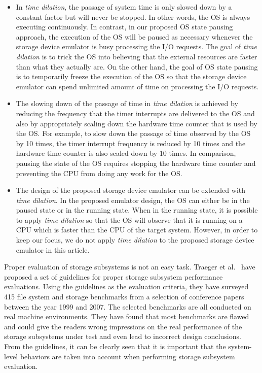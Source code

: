 \begin{itemize}
	\item  In \textit{time dilation}, the passage of system time is only slowed down by a constant factor but will never be stopped. In other words, the OS is always executing continuously. In contrast, in our proposed OS state pausing approach, the execution of the OS will be paused as necessary whenever the storage device emulator is busy processing the I/O requests. The goal of \textit{time dilation} is to trick the OS into believing that the external resources are faster than what they actually are. On the other hand, the goal of OS state pausing is to temporarily freeze the execution of the OS so that the storage device emulator can spend unlimited amount of time on processing the I/O requests.
	
	\item The slowing down of the passage of time in \textit{time dilation} is achieved by reducing the frequency that the timer interrupts are delivered to the OS and also by appropriately scaling down the hardware time counter that is used by the OS. For example, to slow down the passage of time observed by the OS by 10 times, the timer interrupt frequency is reduced by 10 times and the hardware time counter is also scaled down by 10 times. In comparison, pausing the state of the OS requires stopping the hardware time counter and preventing the CPU from doing any work for the OS.
	
	\item The design of the proposed storage device emulator can be extended with \textit{time dilation}. In the proposed emulator design, the OS can either be in the paused state or in the running state. When in the running state, it is possible to apply \textit{time dilation} so that the OS will observe that it is running on a CPU which is faster than the CPU of the target system. However, in order to keep our focus, we do not apply \textit{time dilation} to the proposed storage device emulator in this article.
\end{itemize}

Proper evaluation of storage subsystems is not an easy task. Traeger et al.~\cite{Traeger:2008} have proposed a set of guidelines for proper storage subsystem performance evaluations.
Using the guidelines as the evaluation criteria, they have surveyed 415 file system and storage benchmarks from a selection of conference papers between the year 1999 and 2007. The selected benchmarks are all conducted on real machine environments. They have found that most benchmarks are flawed and could give the readers wrong impressions on the real performance of the storage subsystems under test and even lead to incorrect design conclusions. From the guidelines, it can be clearly seen that it is important that the system-level behaviors are taken into account when performing storage subsystem evaluation.

